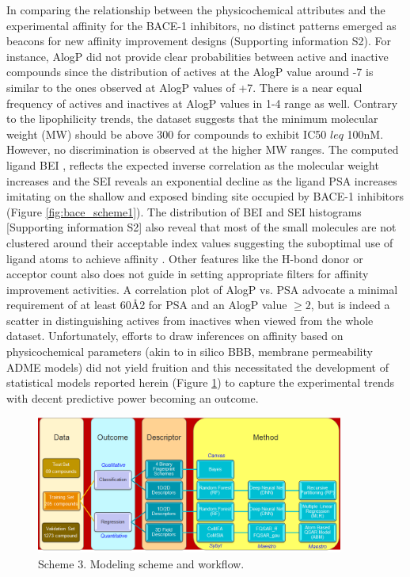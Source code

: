 In comparing the relationship between the physicochemical attributes and the experimental affinity for the BACE-1 inhibitors, no distinct patterns emerged as beacons for new affinity improvement designs (Supporting information S2).  For instance, AlogP did not provide clear probabilities between active and inactive compounds since the distribution of actives at the AlogP value around -7 is similar to the ones observed at AlogP values of +7.  There is a near equal frequency of actives and inactives at AlogP values in 1-4 range as well.  Contrary to the lipophilicity trends, the dataset suggests that the minimum molecular weight (MW) should be above 300 for compounds to exhibit IC50 $leq$ 100nM.  However, no discrimination is observed at the higher MW ranges.  The computed ligand BEI \cite{abad2005ligand, abad2007ligand}, reflects the expected inverse correlation as the molecular weight increases and the SEI reveals an exponential decline as the ligand PSA increases imitating on the shallow and exposed binding site occupied by BACE-1 inhibitors (Figure \ref{fig:bace_scheme1}).  The distribution of BEI and SEI histograms [Supporting information S2] also reveal that most of the small molecules are not clustered around their acceptable index values suggesting the suboptimal use of ligand atoms to achieve affinity \cite{mignani2016compound}.  Other features like the H-bond donor or acceptor count also does not guide in setting appropriate filters for affinity improvement activities.  A correlation plot of AlogP vs. PSA advocate a minimal requirement of at least 60Å2 for PSA and an AlogP value $\geq 2$, but is indeed a scatter in distinguishing actives from inactives when viewed from the whole dataset.  Unfortunately, efforts to draw inferences on affinity based on physicochemical parameters (akin to in silico BBB, membrane permeability ADME models) did not yield fruition and this necessitated the development of statistical models reported herein (Figure \ref{fig:bace_scheme3}) to capture the experimental trends with decent predictive power becoming an outcome.

\begin{figure}
  \centering
  \includegraphics[width=0.9\textwidth]{Images/bace_scheme3.png}
  \caption{Scheme 3.  Modeling scheme and workflow.}
  \label{fig:bace_scheme3}
\end{figure}



